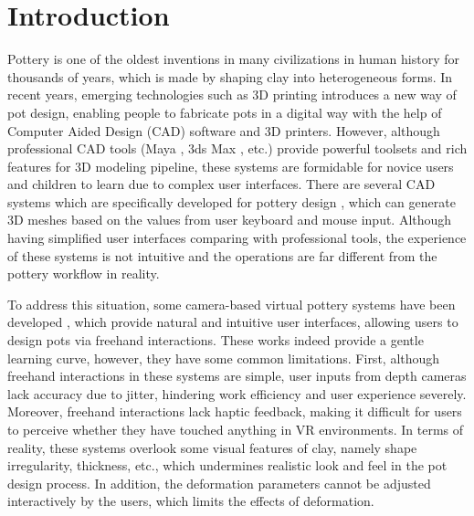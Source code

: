 \documentclass{svjour3}                     %
\begin{document}

\section{Introduction}
\label{sec:1}
Pottery is one of the oldest inventions in many civilizations in human history for thousands of years, which is made by shaping clay into heterogeneous forms.
In recent years, emerging technologies such as 3D printing introduces a new way of pot design, enabling people to fabricate pots in a digital way with the help of Computer Aided Design (CAD) software and 3D printers.
However, although professional CAD tools (Maya \cite{website:maya}, 3ds Max \cite{website:3dmax}, etc.) provide powerful toolsets and rich features for 3D modeling pipeline, these systems are formidable for novice users and children to learn due to complex user interfaces.
There are several CAD systems which are specifically developed for pottery design \cite{koutsoudis2009qp,kumar2011wheel}, which can generate 3D meshes based on the values from user keyboard and mouse input. Although having simplified user interfaces comparing with professional tools, the experience of these systems is not intuitive and the operations are far different from the pottery workflow in reality.

To address this situation, some camera-based virtual pottery systems have been developed \cite{ramani2015gesture,murugappan2013handy,han2014virtual}, which provide natural and intuitive user interfaces, allowing users to design pots via freehand interactions.
These works indeed provide a gentle learning curve, however, they have some common limitations.
First, although freehand interactions in these systems are simple, user inputs from depth cameras lack accuracy due to jitter, hindering work efficiency and user experience severely.
%
Moreover, freehand interactions lack haptic feedback, making it difficult for users to perceive whether they have touched anything in VR environments. In terms of reality, these systems overlook some visual features of clay, namely shape irregularity, thickness, etc., which undermines realistic look and feel in the pot design process.
%
In addition, the deformation parameters cannot be adjusted interactively by the users, which limits the effects of deformation.
\end{document}
